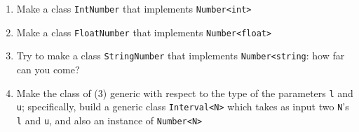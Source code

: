 \begin{enumerate}
	\item Make a class \texttt{IntNumber} that implements \texttt{Number<int>}
	\item Make a class \texttt{FloatNumber} that implements \texttt{Number<float>}
	\item Try to make a class \texttt{StringNumber} that implements \texttt{Number<string}: how far can you come?
	
	\item Make the class of (3) generic with respect to the type of the parameters \texttt{l} and \texttt{u}; specifically, build a generic class \texttt{Interval<N>} which takes as input two \texttt{N}'s \texttt{l} and \texttt{u}, and also an instance of \texttt{Number<N>}
	
\end{enumerate}
